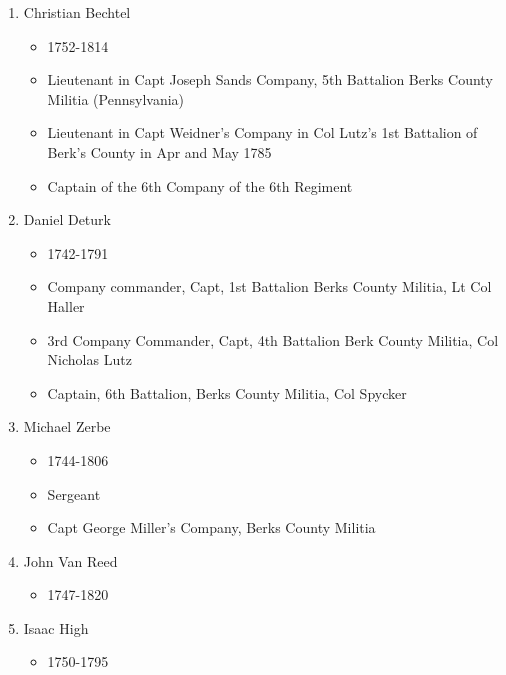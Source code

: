 \documentclass[11pt,letter]{book}
\begin{document}
\begin{enumerate}
\item Christian Bechtel
\begin{itemize}
\item 1752-1814
\item Lieutenant in Capt Joseph Sands Company, 5th Battalion Berks County Militia (Pennsylvania) 
\item Lieutenant in Capt Weidner's Company in Col Lutz's 1st Battalion of Berk's County in Apr and May 1785 
\item Captain of the 6th Company of the 6th Regiment 
\end{itemize}

\item Daniel Deturk
\begin{itemize}
\item 1742-1791
\item Company commander, Capt, 1st Battalion Berks County Militia, Lt Col Haller 
\item 3rd Company Commander, Capt, 4th Battalion Berk County Militia, Col Nicholas Lutz 
\item Captain, 6th Battalion, Berks County Militia, Col Spycker 
\end{itemize}

\item Michael Zerbe
\begin{itemize}
\item 1744-1806
\item Sergeant
\item Capt George Miller's Company, Berks County Militia 
\end{itemize}

\item John Van Reed
\begin{itemize}
\item 1747-1820
\end{itemize}

\item Isaac High
\begin{itemize}
\item 1750-1795
\end{itemize}


\end{enumerate}
\end{document}
